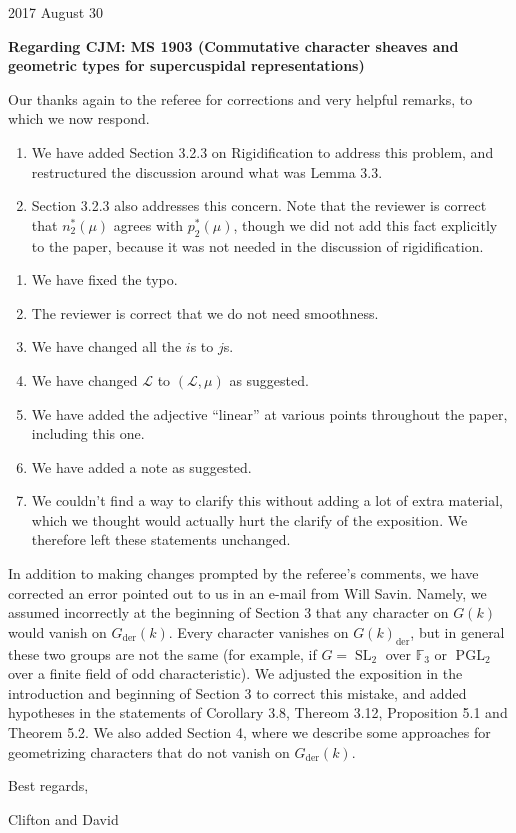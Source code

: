 \documentclass[letter,10pt]{amsart}
\theoremstyle{plain}
\theoremstyle{definition}
\newcommand{\FFF}{\mathbb{F}_3}
\DeclareMathOperator{\SL}{SL}
\DeclareMathOperator{\PGL}{PGL}
\newcommand{\der}{_{\operatorname{der}}}
\newcommand{\cs}[1]{{\mathcal{#1}}}
\begin{document}
{\hfill {2017 August 30} \\ 
}



\noindent\textbf{Regarding CJM: MS 1903 (Commutative character sheaves and geometric types for supercuspidal representations)} %

\bigskip

\medskip

Our thanks again to the referee for corrections and very helpful remarks, to which we now respond.

\begin{enumerate}[label=(\arabic*)]
\item We have added Section 3.2.3 on Rigidification to address this problem, and restructured the discussion around what was Lemma 3.3.
\item Section 3.2.3 also addresses this concern.  Note that the reviewer is correct that $n^*_2(\mu)$ agrees with $p^*_2(\mu)$, though we did not add this fact explicitly to the paper, because it was not needed in the discussion of rigidification.
\end{enumerate}

\begin{enumerate}[label=(\roman*)]
\item We have fixed the typo.
\item The reviewer is correct that we do not need smoothness.
\item We have changed all the $i$s to $j$s.
\item We have changed $\cs{L}$ to $(\cs{L}, \mu)$ as suggested.
\item We have added the adjective ``linear'' at various points throughout the paper, including this one.
\item We have added a note as suggested.
\item We couldn't find a way to clarify this without adding a lot of extra material, which we thought would actually hurt the clarify of the exposition.  We therefore left these statements unchanged.
\end{enumerate}

In addition to making changes prompted by the referee's comments, we have corrected an error pointed out to us in an e-mail from Will Savin.  Namely, we assumed incorrectly at the beginning of Section 3 that any character on $G(k)$ would vanish on $G\der(k)$.  Every character vanishes on $G(k)\der$, but in general these two groups are not the same (for example, if $G = \SL_2$ over $\FFF$ or $\PGL_2$ over a finite field of odd characteristic).  We adjusted the exposition in the introduction and beginning of Section 3 to correct this mistake, and added hypotheses in the statements of Corollary 3.8, Thereom 3.12, Proposition 5.1 and Theorem 5.2.  We also added Section 4, where we describe some approaches for geometrizing characters that do not vanish on $G\der(k)$.

\medskip

Best  regards,
\vskip1.5cm

Clifton and David
\end{document}
